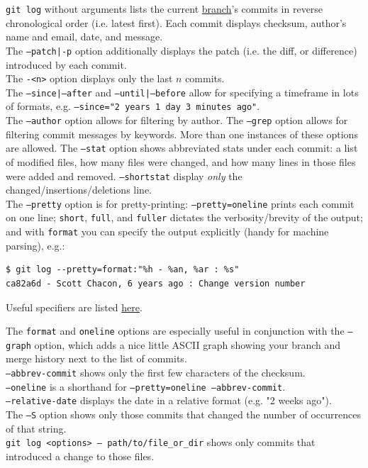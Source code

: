 \documentclass[table, xcdraw]{article}%
\begin{document}
\texttt{git log} without arguments lists the current \hyperref[branching]{branch}'s commits in reverse chronological order (i.e. latest first). Each commit displays checksum, author’s name and email, date, and message.\\
The \texttt{--patch|-p} option additionally displays the patch (i.e. the diff, or difference) introduced by each commit.\\
The \texttt{-<n>} option displays only the last $n$ commits.\\
The \texttt{--since|--after} and \texttt{--until|--before} allow for specifying a timeframe in lots of formats, e.g. \texttt{--since="2 years 1 day 3 minutes ago"}.\\
The \texttt{--author} option allows for filtering by author. The \texttt{--grep} option allows for filtering commit messages by keywords. More than one instances of these options are allowed.
The \texttt{--stat} option shows abbreviated stats under each commit: a list of modified files, how many files were changed, and how many lines in those files were added and removed. \texttt{--shortstat} display \textit{only} the changed/insertions/deletions line.\\
The \texttt{--pretty} option is for pretty-printing: \texttt{--pretty=oneline} prints each commit on one line; \texttt{short}, \texttt{full}, and \texttt{fuller} dictates the verbosity/brevity of the output; and with \texttt{format} you can specify the output explicitly (handy for machine parsing), e.g.:

\begin{verbatim}
$ git log --pretty=format:"%h - %an, %ar : %s"
ca82a6d - Scott Chacon, 6 years ago : Change version number
\end{verbatim}

Useful specifiers are listed \href{https://git-scm.com/book/en/v2/Git-Basics-Viewing-the-Commit-History#pretty_format}{here}.

The \texttt{format} and \texttt{oneline} options are especially useful in conjunction with the \texttt{--graph} option, which adds a nice little ASCII graph showing your branch and merge history next to the list of commits.\\
\texttt{--abbrev-commit} shows only the first few characters of the checksum.\\
\texttt{--oneline} is a shorthand for \texttt{--pretty=oneline --abbrev-commit}.\\
\texttt{--relative-date} displays the date in a relative format (e.g. "2 weeks ago").\\
The \texttt{--S} option shows only those commits that changed the number of occurrences of that string.\\
\texttt{git log <options> -- path/to/file_or_dir} shows only commits that introduced a change to those files.
\end{document}
